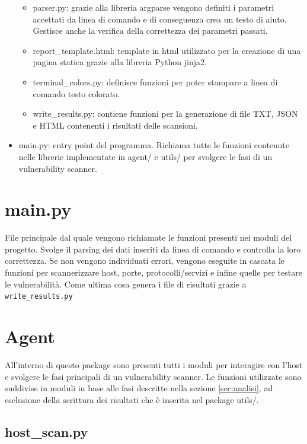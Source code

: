 \documentclass[12pt]{report}
\begin{document}
\begin{itemize}
    \begin{itemize}
        \item parser.py: grazie alla libreria argparse vengono definiti i parametri accettati da linea di comando e di conseguenza crea un testo di aiuto. Gestisce anche la verifica della correttezza dei parametri passati.
        \item report\_template.html: template in html utilizzato per la creazione di una pagina statica grazie alla libreria Python jinja2.
        \item terminal\_colors.py: definisce funzioni per poter stampare a linea di comando testo colorato.
        \item write\_results.py: contiene funzioni per la generazione di file TXT, JSON e HTML contenenti i risultati delle scansioni.
    \end{itemize}
    \item main.py: entry point del programma. Richiama tutte le funzioni contenute nelle librerie implementate in agent/ e utils/ per svolgere le fasi di un vulnerability scanner.
\end{itemize}

\section{main.py}

File principale dal quale vengono richiamate le funzioni presenti nei moduli del progetto. Svolge il parsing dei dati inseriti da linea di comando e controlla la loro correttezza. Se non vengono individuati errori, vengono eseguite in cascata le funzioni per scannerizzare host, porte, protocolli/servizi e infine quelle per testare le vulnerabilità. Come ultima cosa genera i file di risultati grazie a \lstinline{write_results.py}


\section{Agent}

All'interno di questo package sono presenti tutti i moduli per interagire con l'host e svolgere le fasi principali di un vulnerability scanner. Le funzioni utilizzate sono suddivise in moduli in base alle fasi descritte nella sezione \ref{sec:analisi}, ad esclusione della scrittura dei risultati che è inserita nel package utils/.

\subsection{host\_scan.py}
\end{document}
